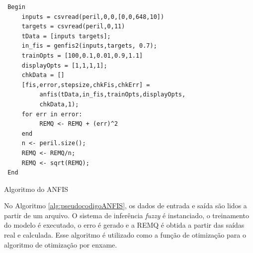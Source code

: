 \begin{algorithm}[H]
\label{alg:pseudocodigoANFIS}
\begin{verbatim}
 Begin
     inputs = csvread(peril,0,0,[0,0,648,10])
     targets = csvread(peril,0,11)
     tData = [inputs targets];
     in_fis = genfis2(inputs,targets, 0.7);
     trainOpts = [100,0.1,0.01,0.9,1.1]
     displayOpts = [1,1,1,1];
     chkData = []
     [fis,error,stepsize,chkFis,chkErr] = 
          anfis(tData,in_fis,trainOpts,displayOpts,
          chkData,1);
     for err in error:
          REMQ <- REMQ + (err)^2
     end
     n <- peril.size();
     REMQ <- REMQ/n;
     REMQ <- sqrt(REMQ);
 End
\end{verbatim}
\caption{Algoritmo do ANFIS}
\end{algorithm}
\bigskip

No Algoritmo \ref{alg:pseudocodigoANFIS}, os dados de entrada e saída são lidos a partir de um arquivo. O sistema de inferência \textit{fuzzy} é instanciado, o treinamento do modelo é executado, o erro é gerado e a REMQ é obtida a partir das saídas real e calculada. Esse algoritmo é utilizado como a função de otimização para o algoritmo de otimização por enxame.

\pagebreak